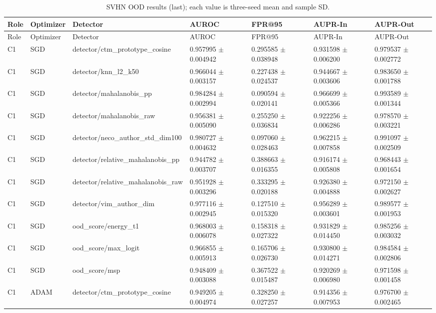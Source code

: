 \begin{longtable}{lllllll}
\caption{SVHN OOD results (last); each value is three-seed mean and sample SD.}\\
Role & Optimizer & Detector & AUROC & FPR@95 & AUPR-In & AUPR-Out \\
\hline
\endfirsthead
Role & Optimizer & Detector & AUROC & FPR@95 & AUPR-In & AUPR-Out \\
\hline
\endhead
C1 & SGD & detector/ctm\_prototype\_cosine & 0.957995 $\pm$ 0.004942 & 0.295585 $\pm$ 0.038948 & 0.931598 $\pm$ 0.006200 & 0.979537 $\pm$ 0.002772 \\
C1 & SGD & detector/knn\_l2\_k50 & 0.966044 $\pm$ 0.003157 & 0.227438 $\pm$ 0.024537 & 0.944667 $\pm$ 0.003606 & 0.983650 $\pm$ 0.001788 \\
C1 & SGD & detector/mahalanobis\_pp & 0.984284 $\pm$ 0.002994 & 0.090594 $\pm$ 0.020141 & 0.966699 $\pm$ 0.005366 & 0.993589 $\pm$ 0.001344 \\
C1 & SGD & detector/mahalanobis\_raw & 0.956381 $\pm$ 0.005090 & 0.255250 $\pm$ 0.036834 & 0.922256 $\pm$ 0.006286 & 0.978570 $\pm$ 0.003221 \\
C1 & SGD & detector/neco\_author\_std\_dim100 & 0.980727 $\pm$ 0.004632 & 0.097060 $\pm$ 0.028463 & 0.962215 $\pm$ 0.007858 & 0.991097 $\pm$ 0.002509 \\
C1 & SGD & detector/relative\_mahalanobis\_pp & 0.944782 $\pm$ 0.003707 & 0.388663 $\pm$ 0.016355 & 0.916174 $\pm$ 0.005808 & 0.968443 $\pm$ 0.001654 \\
C1 & SGD & detector/relative\_mahalanobis\_raw & 0.951928 $\pm$ 0.003296 & 0.333295 $\pm$ 0.020188 & 0.926380 $\pm$ 0.004888 & 0.972150 $\pm$ 0.002627 \\
C1 & SGD & detector/vim\_author\_dim & 0.977116 $\pm$ 0.002945 & 0.127510 $\pm$ 0.015320 & 0.956289 $\pm$ 0.003601 & 0.989577 $\pm$ 0.001953 \\
C1 & SGD & ood\_score/energy\_t1 & 0.968003 $\pm$ 0.006078 & 0.158318 $\pm$ 0.027322 & 0.931829 $\pm$ 0.014450 & 0.985256 $\pm$ 0.003032 \\
C1 & SGD & ood\_score/max\_logit & 0.966855 $\pm$ 0.005913 & 0.165706 $\pm$ 0.026730 & 0.930800 $\pm$ 0.014271 & 0.984584 $\pm$ 0.002806 \\
C1 & SGD & ood\_score/msp & 0.948409 $\pm$ 0.003088 & 0.367522 $\pm$ 0.015487 & 0.920269 $\pm$ 0.006980 & 0.971598 $\pm$ 0.001458 \\
C1 & ADAM & detector/ctm\_prototype\_cosine & 0.949205 $\pm$ 0.004974 & 0.328250 $\pm$ 0.027257 & 0.914356 $\pm$ 0.007953 & 0.976700 $\pm$ 0.002465 \\

\end{longtable}
